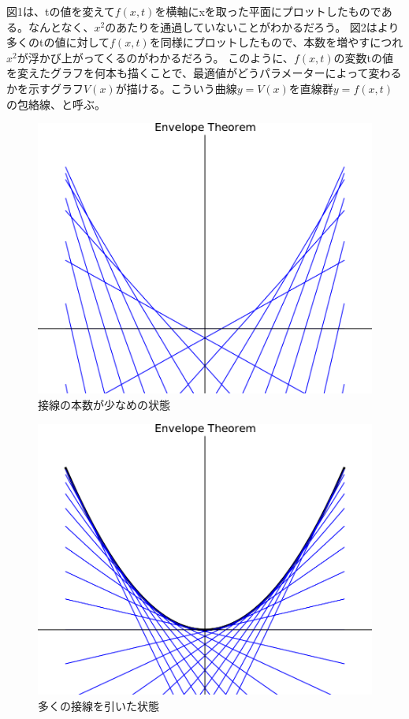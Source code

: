 \documentclass[11pt,a4j,fleqn]{jarticle}
\begin{document}
図1は、tの値を変えて$f(x,t)$を横軸にxを取った平面にプロットしたものである。なんとなく、$x^2$のあたりを通過していないことがわかるだろう。
図2はより多くのtの値に対して$f(x,t)$を同様にプロットしたもので、本数を増やすにつれ$x^2$が浮かび上がってくるのがわかるだろう。
このように、$f(x,t)$の変数tの値を変えたグラフを何本も描くことで、最適値がどうパラメーターによって変わるかを示すグラフ$V(x)$が描ける。こういう曲線$y=V(x)$を直線群$y=f(x,t)$の包絡線、と呼ぶ。



\begin{figure}[H]
\begin{center}
\includegraphics[scale=0.5]{envelope1.pdf}
\end{center}
\caption{接線の本数が少なめの状態}
\label{fig:1}
\end{figure}

\begin{figure}[H]
\begin{center}
\includegraphics[scale=0.5]{envelope0.pdf}
\end{center}
\caption{多くの接線を引いた状態}
\label{fig:2}
\end{figure}
\end{document}
